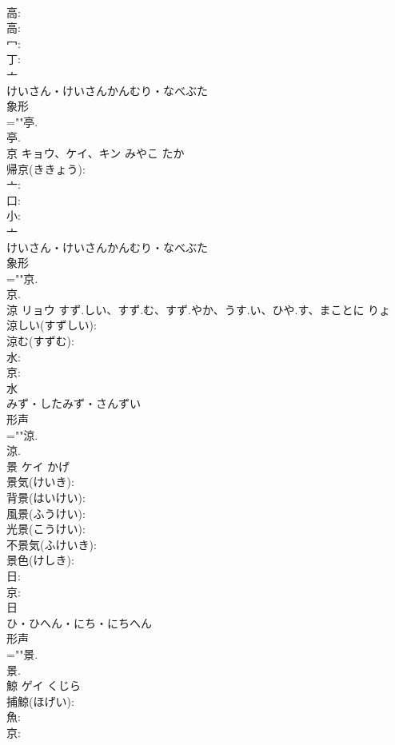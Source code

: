 \documentclass[8pt]{extreport}
\begin{document}
\begin{CJK}{UTF8}{min}
\\	高: 
\\	高: 
\\	冖: 
\\	丁: 
\\	亠	
\\	けいさん・けいさんかんむり・なべぶた	
\\	象形 
\\	=""亭.
\\	亭.
\\	京	キョウ、ケイ、キン	みやこ	たか	
\\	帰京(ききょう): 
\\	亠: 
\\	口: 
\\	小: 
\\	亠	
\\	けいさん・けいさんかんむり・なべぶた	
\\	象形 
\\	=""京.
\\	京.
\\	涼	リョウ	すず.しい、すず.む、すず.やか、うす.い、ひや.す、まことに	りょ	
\\	涼しい(すずしい): 
\\	涼む(すずむ): 
\\	水: 
\\	京: 
\\	水	
\\	みず・したみず・さんずい	
\\	形声 
\\	=""涼.
\\	涼.
\\	景	ケイ		かげ	
\\	景気(けいき): 
\\	背景(はいけい): 
\\	風景(ふうけい): 
\\	光景(こうけい): 
\\	不景気(ふけいき): 
\\	景色(けしき): 
\\	日: 
\\	京: 
\\	日	
\\	ひ・ひへん・にち・にちへん	
\\	形声 
\\	=""景.
\\	景.
\\	鯨	ゲイ	くじら		
\\	捕鯨(ほげい): 
\\	魚: 
\\	京: 

\end{CJK}
\end{document}
